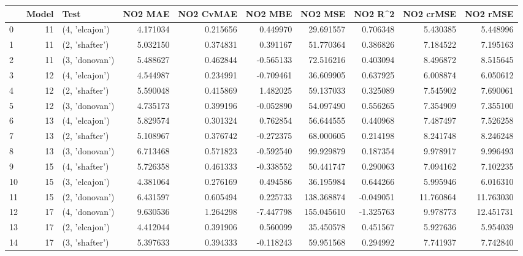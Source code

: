 \begin{tabular}{lrlrrrrrrr}
\toprule
{} &  Model &            Test &    NO2 MAE &  NO2 CvMAE &    NO2 MBE &     NO2 MSE &   NO2 R\textasciicircum2 &  NO2 crMSE &   NO2 rMSE \\
\midrule
0  &     11 &  (4, 'elcajon') &   4.171034 &   0.215656 &   0.449970 &   29.691557 &  0.706348 &   5.430385 &   5.448996 \\
1  &     11 &  (2, 'shafter') &   5.032150 &   0.374831 &   0.391167 &   51.770364 &  0.386826 &   7.184522 &   7.195163 \\
2  &     11 &  (3, 'donovan') &   5.488627 &   0.462844 &  -0.565133 &   72.516216 &  0.403094 &   8.496872 &   8.515645 \\
3  &     12 &  (4, 'elcajon') &   4.544987 &   0.234991 &  -0.709461 &   36.609905 &  0.637925 &   6.008874 &   6.050612 \\
4  &     12 &  (2, 'shafter') &   5.590048 &   0.415869 &   1.482025 &   59.137033 &  0.325089 &   7.545902 &   7.690061 \\
5  &     12 &  (3, 'donovan') &   4.735173 &   0.399196 &  -0.052890 &   54.097490 &  0.556265 &   7.354909 &   7.355100 \\
6  &     13 &  (4, 'elcajon') &   5.829574 &   0.301324 &   0.762854 &   56.644555 &  0.440968 &   7.487497 &   7.526258 \\
7  &     13 &  (2, 'shafter') &   5.108967 &   0.376742 &  -0.272375 &   68.000605 &  0.214198 &   8.241748 &   8.246248 \\
8  &     13 &  (3, 'donovan') &   6.713468 &   0.571823 &  -0.592540 &   99.929879 &  0.187354 &   9.978917 &   9.996493 \\
9  &     15 &  (4, 'shafter') &   5.726358 &   0.461333 &  -0.338552 &   50.441747 &  0.290063 &   7.094162 &   7.102235 \\
10 &     15 &  (3, 'elcajon') &   4.381064 &   0.276169 &   0.494586 &   36.195984 &  0.644266 &   5.995946 &   6.016310 \\
11 &     15 &  (2, 'donovan') &   6.431597 &   0.605494 &   0.225733 &  138.368874 & -0.049051 &  11.760864 &  11.763030 \\
12 &     17 &  (4, 'donovan') &   9.630536 &   1.264298 &  -7.447798 &  155.045610 & -1.325763 &   9.978773 &  12.451731 \\
13 &     17 &  (2, 'elcajon') &   4.412044 &   0.391906 &   0.560099 &   35.450578 &  0.451567 &   5.927636 &   5.954039 \\
14 &     17 &  (3, 'shafter') &   5.397633 &   0.394333 &  -0.118243 &   59.951568 &  0.294992 &   7.741937 &   7.742840 \\

\end{tabular}

